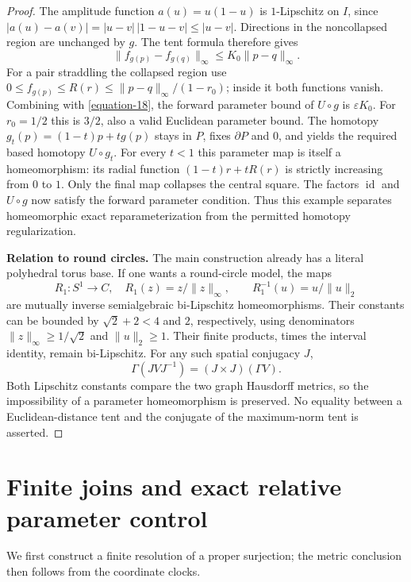 \documentclass[11pt,a4paper]{article}
\theoremstyle{definition}
\begin{document}
\begin{proof}
The amplitude function $a(u)=u(1-u)$ is $1$-Lipschitz on $I$,
since $|a(u)-a(v)|=|u-v|\,|1-u-v|\le|u-v|$.
Directions in the noncollapsed region are unchanged by $g$.
The tent formula therefore gives
\begin{equation}
             \|f_{g(p)}-f_{g(q)}\|_\infty
                                     \le K_0\|p-q\|_\infty.
 \label{equation-27}
\end{equation}
For a pair straddling the collapsed region use
$0\le f_{g(p)}\le R(r)\le
 \|p-q\|_\infty/(1-r_0)$; inside it both functions vanish.
Combining with \eqref{equation-18}, the forward parameter bound of
$U\circ g$ is $\varepsilon K_0$.
For $r_0=1/2$ this is $3/2$, also a valid Euclidean
parameter bound. The homotopy
$g_t(p)=(1-t)p+tg(p)$ stays in $P$, fixes $\partial P$ and $0$,
and yields the required based homotopy $U\circ g_t$.
For every $t<1$ this parameter map is itself a homeomorphism:
its radial function $(1-t)r+tR(r)$ is strictly increasing from
$0$ to $1$. Only the final map collapses the central square.
The factors $\operatorname{id}$ and $U\circ g$ now satisfy
the forward parameter condition. Thus this example separates
homeomorphic exact reparameterization from the permitted homotopy
regularization.

\textbf{Relation to round circles.}
The main construction already has a literal polyhedral torus base.
If one wants a round-circle model, the maps
\begin{equation}
 R_1:S^1\to C,\quad R_1(z)=z/\|z\|_\infty,\qquad
 R_1^{-1}(u)=u/\|u\|_2
 \label{equation-28}
\end{equation}
are mutually inverse semialgebraic bi-Lipschitz homeomorphisms.
Their constants can be bounded by $\sqrt2+2<4$ and $2$,
respectively, using denominators $\|z\|_\infty\ge1/\sqrt2$
and $\|u\|_2\ge1$. Their finite products, times the interval
identity, remain bi-Lipschitz. For any such spatial conjugacy $J$,
\[
        \Gamma(JVJ^{-1})=(J\times J)(\Gamma V).
\]
Both Lipschitz constants compare the two graph Hausdorff metrics,
so the impossibility of a parameter homeomorphism is preserved.
No equality between a Euclidean-distance tent and the conjugate
of the maximum-norm tent is asserted.
\end{proof}

\section{Finite joins and exact relative parameter control}
We first construct a finite resolution of a proper surjection; the metric conclusion then follows from the coordinate clocks.
\end{document}
